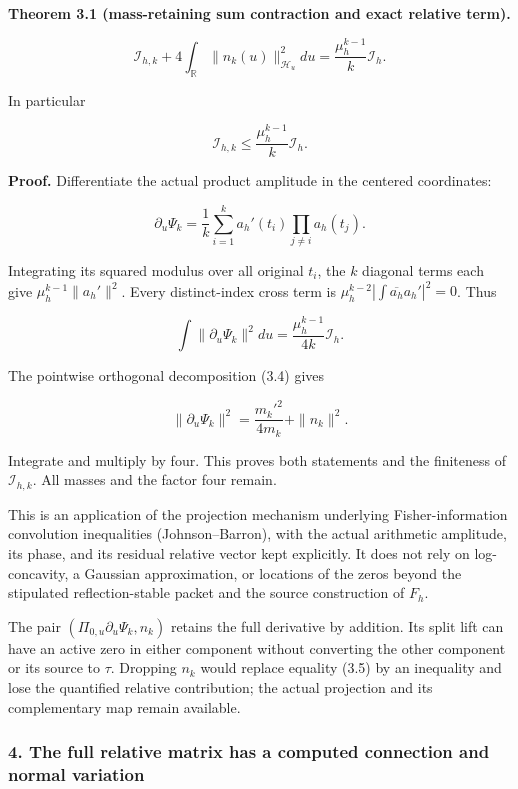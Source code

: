 \textbf{Theorem 3.1 (mass-retaining sum contraction and exact relative
term).}

\[\boxed{\mathcal I_{h,k}+4\int_{\mathbb R}\|n_k(u)\|_{\mathscr H_u}^2du
=\frac{\mu_h^{k-1}}{k}\mathcal I_h.}\tag{3.5}\]

In particular

\[\boxed{\mathcal I_{h,k}\le\frac{\mu_h^{k-1}}{k}\mathcal I_h.}\tag{3.6}\]

\textbf{Proof.} Differentiate the actual product amplitude in the
centered coordinates:

\[\partial_u\Psi_k=\frac1k\sum_{i=1}^k a_h'(t_i)\prod_{j\ne i}a_h(t_j).\]

Integrating its squared modulus over all original \(t_i\), the \(k\)
diagonal terms each give \(\mu_h^{k-1}\|a_h'\|^2\). Every distinct-index
cross term is \(\mu_h^{k-2}|\int\overline{a_h}a_h'|^2=0\). Thus

\[\int\|\partial_u\Psi_k\|^2du=\frac{\mu_h^{k-1}}{4k}\mathcal I_h.\]

The pointwise orthogonal decomposition (3.4) gives

\[\|\partial_u\Psi_k\|^2=\frac{m_k'^2}{4m_k}+\|n_k\|^2.\]

Integrate and multiply by four. This proves both statements and the
finiteness of \(\mathcal I_{h,k}\). All masses and the factor four
remain.

This is an application of the projection mechanism underlying
Fisher-information convolution inequalities (Johnson--Barron), with the
actual arithmetic amplitude, its phase, and its residual relative vector
kept explicitly. It does not rely on log-concavity, a Gaussian
approximation, or locations of the zeros beyond the stipulated
reflection-stable packet and the source construction of \(F_h\).

The pair \((\Pi_{0,u}\partial_u\Psi_k,n_k)\) retains the full derivative
by addition. Its split lift can have an active zero in either component
without converting the other component or its source to \(\tau\).
Dropping \(n_k\) would replace equality (3.5) by an inequality and lose
the quantified relative contribution; the actual projection and its
complementary map remain available.

\subsubsection{4. The full relative matrix has a computed connection and
normal
variation}\label{sum_connection:the-full-relative-matrix-has-a-computed-connection-and-normal-variation}

